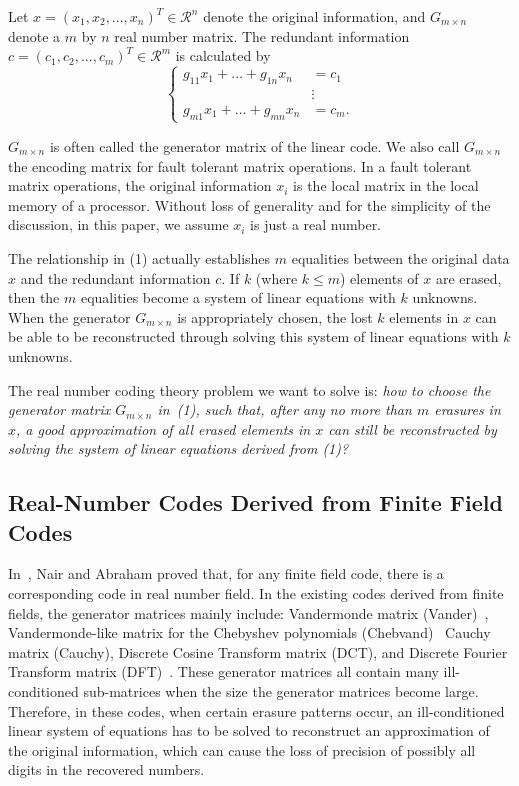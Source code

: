 \documentclass{sig-alternate}
\begin{document}
Let $ x = ( x_1, x_2, . . ., x_n )^T \in \mathcal{R}^n $ 
denote the original information, and $ G_{m \times n} $ denote a $m$ by $n$ real number matrix.
The redundant information $c = ( c_1, c_2, . . ., c_m)^T \in \mathcal{R}^m $
is calculated by
\begin{equation}
\label{eq2}
\begin{cases}
g_{1 1} x_1 + \ldots + g_{1 n} x_n & =   c_1 \\
& \vdots   \\
g_{m 1} x_1 + \ldots + g_{m n} x_n & =   c_m. 
\end{cases}
\end{equation}

$G_{m \times n}$  is often called the generator matrix of the linear code.
We also call $G_{m \times n}$ the encoding matrix for fault tolerant matrix 
operations. In a fault tolerant matrix operations, the original 
information $x_i$ is the local matrix in the local memory of a processor. 
Without loss of generality and for the simplicity of the discussion, 
in this paper, we assume $x_i$ is just a real number.

The relationship in (1) actually
establishes $m$ equalities between the original data $x$ 
and the redundant information $c$.
If $k$ (where $k\leq m$) elements of $x$ are erased,
then the $m$ equalities 
become a system of linear equations with $k$ unknowns.
When the generator $G_{m \times n}$ is appropriately chosen, 
the lost $k$ elements in $x$ can be able to be reconstructed through 
solving this system of linear equations with $k$ unknowns.


The real number coding theory problem we want to solve is: 
{\it how to choose the generator matrix $G_{m \times n}$ in~(1),
such that, after any no more than $m$ erasures in $x$,
a good approximation of all erased elements in
$x$ can still be reconstructed by solving the system of linear equations 
derived from (1)?}


\subsection{Real-Number Codes Derived from Finite Field Codes}
In~\cite{Nair90}, Nair and Abraham proved that, for any finite field code,
there is a corresponding code in real number field.
In the existing codes derived from finite fields,
the generator matrices mainly include: Vandermonde matrix (Vander)~\cite{hadjicostis:coding}, 
Vandermonde-like matrix for the Chebyshev polynomials (Chebvand)~\cite{boley92:abft} 
Cauchy matrix (Cauchy), Discrete Cosine Transform matrix (DCT), and  
Discrete Fourier Transform matrix (DFT)~\cite{Ferreira00, Ferreira03}. These generator
matrices all contain many ill-conditioned sub-matrices 
when the size the generator matrices become large. Therefore, in these codes, when
certain erasure patterns occur, an ill-conditioned linear system of equations has to be solved
to reconstruct an approximation of the original information, which can cause
the loss of precision of possibly all digits in the recovered numbers.
\end{document}
